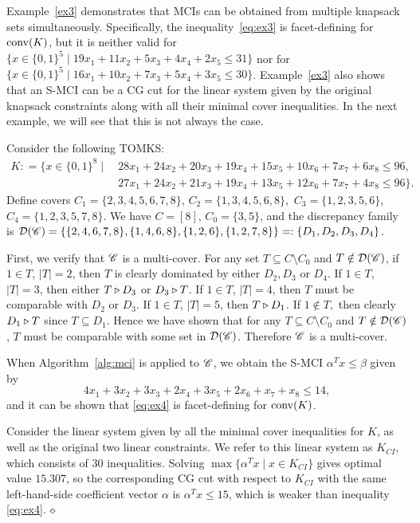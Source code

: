 Example~\ref{ex3} demonstrates that MCIs can be obtained from multiple knapsack sets simultaneously.  
Specifically, the inequality~\eqref{eq:ex3} is facet-defining for $\operatorname{conv}(K)$, but it is neither valid for $\{x \in \{0,1\}^5 \mid 19 x_1 + 11x_2 + 5x_3 + 4x_4 + 2x_5 \leq 31 \}$ nor for $\{x \in \{0,1\}^5 \mid 16 x_1 + 10 x_2 + 7 x_3 + 5 x_4 + 3 x_5 \leq 30\}$.  Example~\ref{ex3} also shows that an S-MCI can be a CG cut for the linear system given by the original knapsack constraints along with all their minimal cover inequalities.  
In the next example, we will see that this is not always the case.

\begin{example}
\label{ex4}
Consider the following TOMKS: 
{\small
\begin{align*}
K: = \{x \in \{0,1\}^8 \mid \ & 28 x_1 + 24x_2+20x_3+19x_4+15x_5+10x_6+7x_7+6x_8 \leq 96, \\
& 27x_1+24x_2+21x_3+19x_4+13x_5+12x_6+7x_7+4x_8 \leq 96\}.
\end{align*}
}
Define covers $C_1 = \{2,3,4,5,6,7,8\}$, $C_2 = \{1,3,4,5,6,8\},$ $C_3 = \{1,2,3,5,6\}$, $C_4 = \{1,2,3,5,7,8\}$.
We have $C = [8]$, $C_0 = \{3,5\}$, and the discrepancy family is $\mathcal{D}(\mathscr{C}) = \{\{2,4,6,7,8\}, \{1,4,6,8\}, \{1,2,6\}, \{1,2,7,8\}\} =: \{D_1, D_2, D_3, D_4\}$.

First, we verify that $\mathscr{C}$ is a multi-cover. For any set $T \subseteq C \setminus C_0$ and $T \notin \mathcal{D}(\mathscr{C})$, if $1 \in T$, $|T| = 2$, then $T$ is clearly dominated by either $D_2, D_3$ or $D_4$. 
If $1 \in T$, $|T| = 3$, then either $T \triangleright D_3$ or $D_3 \triangleright T$. If $1 \in T$, $|T| = 4$, then $T$ must be comparable with $D_2$ or $D_3$.
If $1 \in T$, $|T| = 5$, then $T \triangleright D_1$. If $1 \notin T,$ then clearly $D_1 \triangleright T$ since $T \subseteq D_1$. Hence we have shown that for any $T \subseteq C \setminus C_0$ and $T \notin \mathcal{D}(\mathscr{C})$, $T$ must be comparable with some set in $\mathcal{D}(\mathscr{C})$. Therefore $\mathscr{C}$ is a multi-cover.

When  Algorithm~\ref{alg:mci} is applied to $\mathscr{C}$, we obtain the S-MCI $\alpha^T x \leq \beta$ given by
\begin{equation}
    4x_1+3x_2+3x_3+2x_4+3x_5+2x_6+x_7+x_8 \leq 14, \label{eq:ex4}
\end{equation}
and it can be shown that \eqref{eq:ex4} is facet-defining for $\operatorname{conv}(K)$. 

Consider the linear system given by all the minimal cover inequalities for $K$, as well as the original two linear constraints. We refer to this linear system as $K_{CI}$, which consists of 30 inequalities. 
Solving $\max\{\alpha^T x \mid x \in K_{CI}\}$ gives optimal value $15.307$, so the corresponding CG cut with respect to $K_{CI}$ with the same left-hand-side coefficient vector $\alpha$ is $\alpha^T x \leq 15$, which is weaker than inequality \eqref{eq:ex4}. 
$\hfill\diamond$
\end{example}



